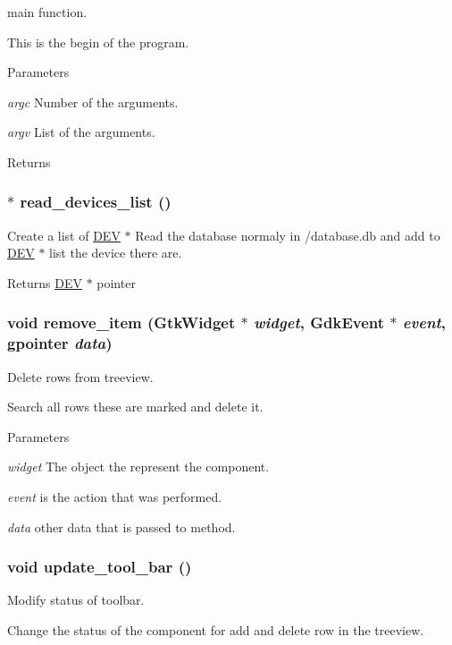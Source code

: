 main function. 

This is the begin of the program. 
\begin{DoxyParams}{Parameters}
\item[{\em argc}]Number of the arguments. \item[{\em argv}]List of the arguments. \end{DoxyParams}
\begin{DoxyReturn}{Returns}

\end{DoxyReturn}
\hypertarget{usb-gui_8h_a1b365986807e777a4e3da379042f731b}{
\subsubsection[{read\_\-devices\_\-list}]{$\ast$ read\_\-devices\_\-list ()}}
\label{usb-gui_8h_a1b365986807e777a4e3da379042f731b}


Create a list of \hyperlink{structDEV}{DEV} $\ast$ Read the database normaly in /database.db and add to \hyperlink{structDEV}{DEV} $\ast$ list the device there are. 

\begin{DoxyReturn}{Returns}
\hyperlink{structDEV}{DEV} $\ast$ pointer 
\end{DoxyReturn}
\hypertarget{usb-gui_8h_adebdd69140dd995853b3d4a40de3c058}{
\subsubsection[{remove\_\-item}]{\setlength{\rightskip}{0pt plus 5cm}void remove\_\-item (GtkWidget $\ast$ {\em widget}, \/  GdkEvent $\ast$ {\em event}, \/  gpointer {\em data})}}
\label{usb-gui_8h_adebdd69140dd995853b3d4a40de3c058}


Delete rows from treeview. 

Search all rows these are marked and delete it. 
\begin{DoxyParams}{Parameters}
\item[{\em widget}]The object the represent the component. \item[{\em event}]is the action that was performed. \item[{\em data}]other data that is passed to method. \end{DoxyParams}
\hypertarget{usb-gui_8h_a3893dfbb92994b551fb34e396c26f5d1}{
\subsubsection[{update\_\-tool\_\-bar}]{\setlength{\rightskip}{0pt plus 5cm}void update\_\-tool\_\-bar ()}}
\label{usb-gui_8h_a3893dfbb92994b551fb34e396c26f5d1}


Modify status of toolbar. 

Change the status of the component for add and delete row in the treeview. 